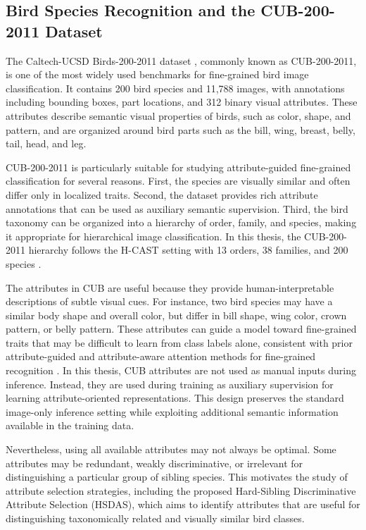 \subsection{Bird Species Recognition and the CUB-200-2011 Dataset}

The Caltech-UCSD Birds-200-2011 dataset \cite{wah2011cub}, commonly known as CUB-200-2011, is one of the most widely used benchmarks for fine-grained bird image classification. It contains 200 bird species and 11,788 images, with annotations including bounding boxes, part locations, and 312 binary visual attributes. These attributes describe semantic visual properties of birds, such as color, shape, and pattern, and are organized around bird parts such as the bill, wing, breast, belly, tail, head, and leg.

CUB-200-2011 is particularly suitable for studying attribute-guided fine-grained classification for several reasons. First, the species are visually similar and often differ only in localized traits. Second, the dataset provides rich attribute annotations that can be used as auxiliary semantic supervision. Third, the bird taxonomy can be organized into a hierarchy of order, family, and species, making it appropriate for hierarchical image classification. In this thesis, the CUB-200-2011 hierarchy follows the H-CAST setting with 13 orders, 38 families, and 200 species \cite{park2025visually}.

The attributes in CUB are useful because they provide human-interpretable descriptions of subtle visual cues. For instance, two bird species may have a similar body shape and overall color, but differ in bill shape, wing color, crown pattern, or belly pattern. These attributes can guide a model toward fine-grained traits that may be difficult to learn from class labels alone, consistent with prior attribute-guided and attribute-aware attention methods for fine-grained recognition \cite{liu2017localizing, han2018attribute}. In this thesis, CUB attributes are not used as manual inputs during inference. Instead, they are used during training as auxiliary supervision for learning attribute-oriented representations. This design preserves the standard image-only inference setting while exploiting additional semantic information available in the training data.

Nevertheless, using all available attributes may not always be optimal. Some attributes may be redundant, weakly discriminative, or irrelevant for distinguishing a particular group of sibling species. This motivates the study of attribute selection strategies, including the proposed Hard-Sibling Discriminative Attribute Selection (HSDAS), which aims to identify attributes that are useful for distinguishing taxonomically related and visually similar bird classes.



